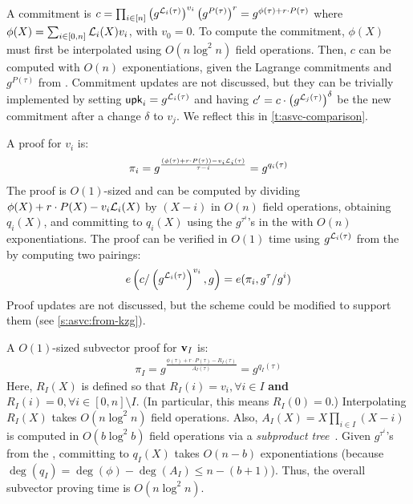 A commitment is $c=\prod_{i\in[n]} \left(g^{\mathcal{L}_i(\tau)}\right)^{v_i} \left(g^{P(\tau)}\right)^{r}= g^{\phi(\tau) + r\cdot P(\tau)}$ where $\phi(X)=\sum_{i\in [0,n]} \mathcal{L}_i(X) v_i$, with $v_0 = 0$.
To compute the commitment, $\phi(X)$ must first be interpolated using $O(n\log^2{n})$ field operations.
Then, $c$ can be computed with $O(n)$ exponentiations, given the Lagrange commitments and $g^{P(\tau)}$ from \prk.
Commitment updates are not discussed, but they can be trivially implemented by setting $\mathsf{upk}_i = g^{\mathcal{L}_i(\tau)}$ and having $c' = c \cdot \left(g^{\mathcal{L}_j(\tau)}\right)^{\delta}$ be the new commitment after a change $\delta$ to $v_j$.
We reflect this in \cref{t:asvc-comparison}.

A proof for $v_i$ is:
\begin{align}
\pi_i = g^{\frac{\left(\phi(\tau)+r\cdot P(\tau)\right)-v_i\mathcal{L}_i(\tau)}{\tau - i}} = g^{q_i(\tau)}
\end{align}
The proof is $O(1)$-sized and can be computed by dividing $\phi(X)+r\cdot P(X)-v_i\mathcal{L}_i(X)$ by $(X-i)$ in $O(n)$ field operations, obtaining $q_i(X)$, and committing to $q_i(X)$ using the $g^{\tau^i}$'s in the \prk with $O(n)$ exponentiations.
The proof can be verified in $O(1)$ time using $g^{\mathcal{L}_i(\tau)}$ from the \vrk by computing two pairings:
\begin{align}
e\left(c/\left(g^{\mathcal{L}_i(\tau)}\right)^{v_i}, g\right) = e(\pi_i, g^{\tau}/g^{i})
\end{align}
Proof updates are not discussed, but the scheme could be modified to support them (see \cref{s:asvc:from-kzg}).

A $O(1)$-sized subvector proof for $\bm{\mathrm{v}}_I$ is:
\begin{align}
\pi_I=g^\frac{\phi(\tau)+r\cdot P(\tau) - R_I(\tau)}{A_I(\tau)}=g^{q_I(\tau)}
\end{align}
Here, $R_I(X)$ is defined so that $R_I(i) = v_i,\forall i\in I$ \textbf{and} $R_I(i) = 0, \forall i \in [0,n]\setminus I$.
(In particular, this means $R_I(0) = 0$.)
Interpolating $R_I(X)$ takes $O(n\log^2{n})$ field operations.
Also, $A_I(X)= X\prod_{i\in I} (X-i)$ is computed in $O(b\log^2{b})$ field operations via a \textit{subproduct tree}~\cite{vG13ModernCh10}.
Given $g^{\tau^i}$'s from the \prk, committing to $q_I(X)$ takes $O(n-b)$ exponentiations (because $\deg(q_I) = \deg(\phi)-\deg(A_I)\le n-(b+1)$).
Thus, the overall subvector proving time is $O(n\log^2{n})$.

